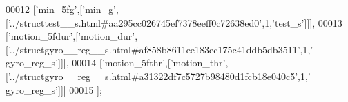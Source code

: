 \begin{DoxyCode}
00012   [\textcolor{stringliteral}{'min\_5fg'},[\textcolor{stringliteral}{'min\_g'},[\textcolor{stringliteral}{'../structtest\_\_s.html#aa295cc026745ef7378eeff0c72638ed0'},1,\textcolor{stringliteral}{'test\_s'}]]],
00013   [\textcolor{stringliteral}{'motion\_5fdur'},[\textcolor{stringliteral}{'motion\_dur'},[\textcolor{stringliteral}{'../structgyro\_\_reg\_\_s.html#af858b8611ee183ec175c41ddb5db3511'},1,\textcolor{stringliteral}{'
      gyro\_reg\_s'}]]],
00014   [\textcolor{stringliteral}{'motion\_5fthr'},[\textcolor{stringliteral}{'motion\_thr'},[\textcolor{stringliteral}{'../structgyro\_\_reg\_\_s.html#a31322df7c5727b98480d1fcb18e040c5'},1,\textcolor{stringliteral}{'
      gyro\_reg\_s'}]]]
00015 ];
\end{DoxyCode}
